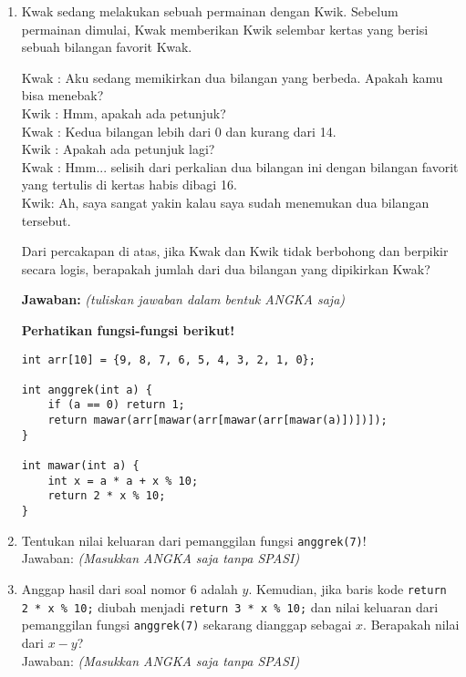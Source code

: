 \documentclass[a4paper,11pt]{article}
\begin{document}
\begin{enumerate}
    \item Kwak sedang melakukan sebuah permainan dengan Kwik. Sebelum permainan dimulai, 
    Kwak memberikan Kwik selembar kertas yang berisi sebuah bilangan favorit Kwak.

    Kwak : Aku sedang memikirkan dua bilangan yang berbeda. Apakah kamu bisa menebak? \\
    Kwik : Hmm, apakah ada petunjuk? \\
    Kwak : Kedua bilangan lebih dari 0 dan kurang dari 14. \\
    Kwik : Apakah ada petunjuk lagi? \\
    Kwak : Hmm... selisih dari perkalian dua bilangan ini dengan bilangan favorit yang tertulis di kertas habis dibagi 16.\\
    Kwik: Ah, saya sangat yakin kalau saya sudah menemukan dua bilangan tersebut.

    Dari percakapan di atas, jika Kwak dan Kwik tidak berbohong dan berpikir secara logis, 
    berapakah jumlah dari dua bilangan yang dipikirkan Kwak?

    \textbf{Jawaban:} \underline{\hspace{3cm}} \textit{(tuliskan jawaban dalam bentuk ANGKA saja)}

\medskip

\textbf{Perhatikan fungsi-fungsi berikut!}
\begin{verbatim}
int arr[10] = {9, 8, 7, 6, 5, 4, 3, 2, 1, 0};

int anggrek(int a) {
    if (a == 0) return 1;
    return mawar(arr[mawar(arr[mawar(arr[mawar(a)])])]);
}

int mawar(int a) {
    int x = a * a + x % 10;
    return 2 * x % 10;
}
\end{verbatim}
\item Tentukan nilai keluaran dari pemanggilan fungsi \texttt{anggrek(7)}! \\
  Jawaban: \underline{\hspace{3cm}} \textit{{(Masukkan ANGKA saja tanpa SPASI)}}

  \item Anggap hasil dari soal nomor 6 adalah $y$. Kemudian, jika baris kode \texttt{return 2 * x \% 10;}
  diubah menjadi \texttt{return 3 * x \% 10;}
  dan nilai keluaran dari pemanggilan fungsi \texttt{anggrek(7)} sekarang dianggap sebagai $x$.
  Berapakah nilai dari $x - y$?\\
  Jawaban: \underline{\hspace{3cm}} \textit{{(Masukkan ANGKA saja tanpa SPASI)}}


\end{enumerate}
\end{document}
